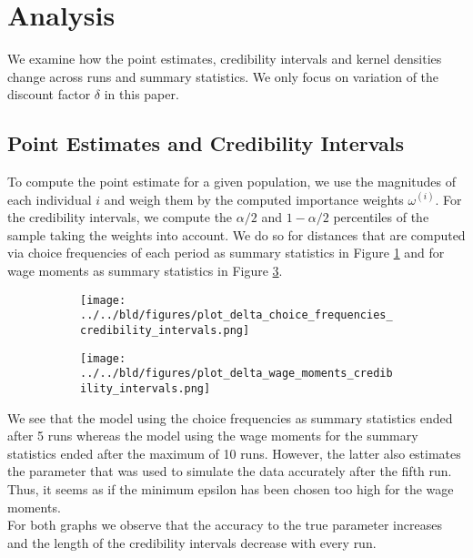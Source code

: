 \documentclass[11pt, a4paper, leqno]{article}
\begin{document}
\section{Analysis}
\label{sec:analysis}
We examine how the point estimates, credibility intervals and kernel densities change across runs and summary statistics. We only focus on variation of the discount factor $\delta$ in this paper.
\subsection{Point Estimates and Credibility Intervals}
\label{subsec:point_estimates}
To compute the point estimate for a given population, we use the magnitudes of each individual $i$ and weigh them by the computed importance weights $\omega^{(i)}$. For the credibility intervals, we compute the $\alpha/2$ and $1- \alpha/2$ percentiles of the sample taking the weights into account.  We do so for distances that are computed via choice frequencies of each period as summary statistics in Figure \ref{fig:choice_frequencies_ci} and for wage moments as summary statistics in Figure \ref{fig:wage_moments_ci}.
\begin{figure}[h!]
\caption{Credibility intervals for all respyabc runs.}
\begin{subfigure}{.5\textwidth}
  \centering
    \texttt{[image: ../../bld/figures/plot\_delta\_choice\_frequencies\_credibility\_intervals.png]}
  \label{fig:choice_frequencies_ci}
\end{subfigure}%
\begin{subfigure}{.5\textwidth}
  \centering
    \texttt{[image: ../../bld/figures/plot\_delta\_wage\_moments\_credibility\_intervals.png]}
  \label{fig:wage_moments_ci}
\end{subfigure}%

\end{figure}
We see that the model using the choice frequencies as summary statistics ended after 5 runs whereas the model using the wage moments for the summary statistics ended after the maximum of 10 runs. However, the latter also estimates the parameter that was used to simulate the data accurately after the fifth run. Thus, it seems as if the minimum epsilon has been chosen too high for the wage moments. \\
For both graphs we observe that the accuracy to the true parameter increases and the length of the credibility intervals decrease with every run.
\end{document}
